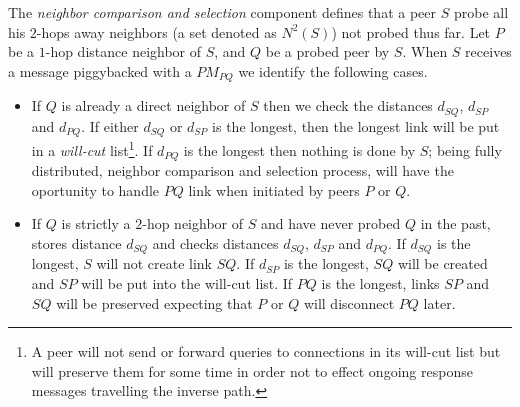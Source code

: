 The \emph{neighbor comparison and selection} component defines that a peer $S$
probe all his $2$-hops away neighbors (a set denoted as $ N^2(S)$) not probed
thus far. Let $P$ be a $1$-hop distance neighbor of $S$, and $Q$ be a probed
peer by $S$. When $S$ receives a message piggybacked with a $PM_{PQ}$ we
identify the following cases.
\begin{itemize}
  \item If $Q$ is already a direct neighbor of $S$ then we check the distances
  $d_{SQ}$, $d_{SP}$ and $d_{PQ}$. If either $d_{SQ}$ or $d_{SP}$ is the longest, then the longest
  link will be put in a \emph{will-cut} list\footnote{A peer will not send or
  forward queries to connections in its will-cut list but will preserve them
  for some time in order not to effect ongoing response messages travelling the
  inverse path.}. If $d_{PQ}$ is the longest then nothing is done by $S$; being
  fully distributed, neighbor comparison and selection process, will have the
  oportunity to handle $PQ$ link when initiated by peers $P$ or $Q$.

  \item If $Q$ is strictly a $2$-hop neighbor of $S$ and have never probed $Q$
  in the past, stores distance $d_{SQ}$ and checks distances $d_{SQ}$, $d_{SP}$ and $d_{PQ}$.
  If $d_{SQ}$ is the longest, $S$ will not create link $SQ$. If $d_{SP}$ is the
  longest, $SQ$ will be created and $SP$ will be put into the will-cut list.
  If $PQ$ is the longest, links $SP$ and $SQ$ will be preserved expecting that
  $P$ or $Q$ will disconnect $PQ$ later.
\end{itemize}

